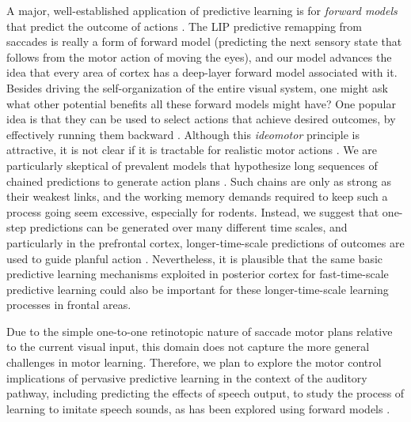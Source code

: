 \documentclass[11pt,twoside]{article}
\newif\myifpdf
\begin{document}
A major, well-established application of predictive learning is for {\em forward models} that predict the outcome of actions \cite{KawatoFurukawaSuzuki87,JordanRumelhart92,MiallWolpert96}.  The LIP predictive remapping from saccades is really a form of forward model (predicting the next sensory state that follows from the motor action of moving the eyes), and our model advances the idea that every area of cortex has a deep-layer forward model associated with it.  Besides driving the self-organization of the entire visual system, one might ask what other potential benefits all these forward models might have?  One popular idea is that they can be used to select actions that achieve desired outcomes, by effectively running them backward \cite{Hommel04,James90,PezzuloCastelfranchi09,Friston10}.  Although this {\em ideomotor} principle is attractive, it is not clear if it is tractable for realistic motor actions \cite{HerbortButz12,JordanRumelhart92}.  We are particularly skeptical of prevalent models that hypothesize long sequences of chained predictions to generate action plans \cite{BurgessOKeefe97,PastalkovaItskovAmarasinghamEtAl08,LismanRedish09}.  Such chains are only as strong as their weakest links, and the working memory demands required to keep such a process going seem excessive, especially for rodents.  Instead, we suggest that one-step predictions can be generated over many different time scales, and particularly in the prefrontal cortex, longer-time-scale predictions of outcomes are used to guide planful action \cite{OReillyHazyMollickEtAl14,OReillyPetrovCohenEtAl14,OReillyHazyHerd15}.  Nevertheless, it is plausible that the same basic predictive learning mechanisms exploited in posterior cortex for fast-time-scale predictive learning could also be important for these longer-time-scale learning processes in frontal areas.  

Due to the simple one-to-one retinotopic nature of saccade motor plans relative to the current visual input, this domain does not capture the more general challenges in motor learning.  Therefore, we plan to explore the motor control implications of pervasive predictive learning in the context of the auditory pathway, including predicting the effects of speech output, to study the process of learning to imitate speech sounds, as has been explored using forward models \cite{GuentherVladusich12}.
\end{document}

